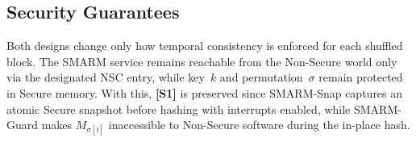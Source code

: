 \documentclass[conference]{IEEEtran}
\newcommand{\smarmcopy}{SMARM-Snap\xspace}
\newcommand{\smarmlock}{SMARM-Guard\xspace}
\begin{document}
\subsection{Security Guarantees}
\label{sec:security_summary}







Both designs change only how temporal consistency is enforced for each shuffled block.
The SMARM service remains reachable from the Non-Secure world only via
the designated NSC entry, while key~$k$ and permutation~$\sigma$
remain protected in Secure memory.
With this, \textbf{[S1]} is preserved since \smarmcopy{} captures an atomic Secure snapshot before hashing with interrupts enabled, while \smarmlock{} makes $M_{\sigma[i]}$ inaccessible to Non-Secure software during the in-place hash.
\end{document}
